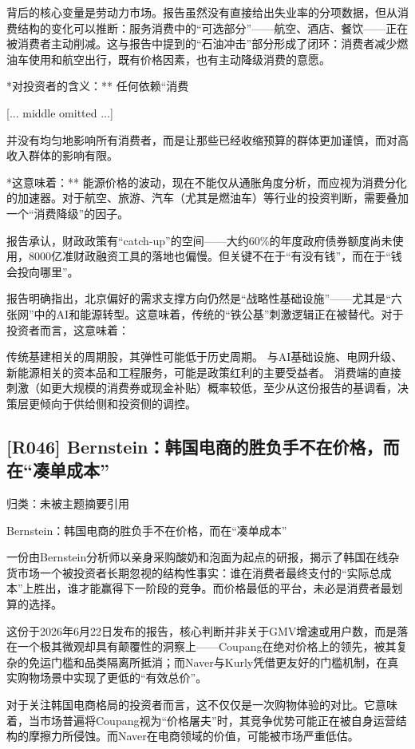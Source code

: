 \documentclass[11pt]{ctexart}
\begin{document}
背后的核心变量是劳动力市场。报告虽然没有直接给出失业率的分项数据，但从消费结构的变化可以推断：服务消费中的“可选部分”——航空、酒店、餐饮——正在被消费者主动削减。这与报告中提到的“石油冲击”部分形成了闭环：消费者减少燃油车使用和航空出行，既有价格因素，也有主动降级消费的意愿。

*对投资者的含义：** 任何依赖“消费

[... middle omitted ...]

并没有均匀地影响所有消费者，而是让那些已经收缩预算的群体更加谨慎，而对高收入群体的影响有限。

*这意味着：** 能源价格的波动，现在不能仅从通胀角度分析，而应视为消费分化的加速器。对于航空、旅游、汽车（尤其是燃油车）等行业的投资判断，需要叠加一个“消费降级”的因子。

报告承认，财政政策有“catch-up”的空间——大约60\%的年度政府债券额度尚未使用，8000亿准财政融资工具的落地也偏慢。但关键不在于“有没有钱”，而在于“钱会投向哪里”。

报告明确指出，北京偏好的需求支撑方向仍然是“战略性基础设施”——尤其是“六张网”中的AI和能源转型。这意味着，传统的“铁公基”刺激逻辑正在被替代。对于投资者而言，这意味着：

传统基建相关的周期股，其弹性可能低于历史周期。 与AI基础设施、电网升级、新能源相关的资本品和工程服务，可能是政策红利的主要受益者。 消费端的直接刺激（如更大规模的消费券或现金补贴）概率较低，至少从这份报告的基调看，决策层更倾向于供给侧和投资侧的调控。

\subsection{[R046] Bernstein：韩国电商的胜负手不在价格，而在“凑单成本”}
{\small\color{refgray}归类：未被主题摘要引用}

Bernstein：韩国电商的胜负手不在价格，而在“凑单成本”

一份由Bernstein分析师以亲身采购酸奶和泡面为起点的研报，揭示了韩国在线杂货市场一个被投资者长期忽视的结构性事实：谁在消费者最终支付的“实际总成本”上胜出，谁才能赢得下一阶段的竞争。而价格最低的平台，未必是消费者最划算的选择。

这份于2026年6月22日发布的报告，核心判断并非关于GMV增速或用户数，而是落在一个极其微观却具有颠覆性的洞察上——Coupang在绝对价格上的领先，被其复杂的免运门槛和品类隔离所抵消；而Naver与Kurly凭借更友好的门槛机制，在真实购物场景中实现了更低的“有效总价”。

对于关注韩国电商格局的投资者而言，这不仅仅是一次购物体验的对比。它意味着，当市场普遍将Coupang视为“价格屠夫”时，其竞争优势可能正在被自身运营结构的摩擦力所侵蚀。而Naver在电商领域的价值，可能被市场严重低估。
\end{document}
